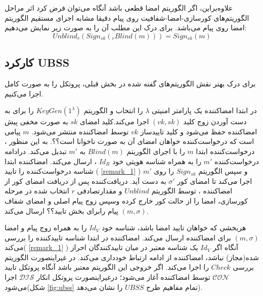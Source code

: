 \documentclass[12pt,a4paper]{article}
\theoremstyle{plain}
\theoremstyle{definition}
\theoremstyle{remark}
\begin{document}
علاوه‌براین، اگر الگوریتم امضا قطعی باشد آنگاه می‌توان فرض کرد اثر مراحل الگوریتم‌های کورسازی-امضا-شفافیت روی پیام دقیقا مشابه اجرای مستقیم الگوریتم امضا روی پیام می‌باشد. برای درک این مطلب آن را به صورت زیر نمایش می‌دهیم:
$$ Unblind_r(Sign_{sk}(_{r}Blind(m))) = Sign_{sk}(m) $$

\newpage
\subsection{کارکرد UBSS}\label{working_ubss}

برای درک بهتر نقش الگوریتم‌های گفته شده در بخش قبلی، پروتکل را به صورت کامل اجرا می‌کنیم.

در ابتدا امضاکننده یک پارامتر امنیتی 
$\lambda$
را انتخاب و الگوریتم 
$KeyGen(1^\lambda)$
را برای به دست آوردن زوج کلید
$(vk,sk)$
اجرا می‌کند.کلید امضای
$sk$
به صورت مخفی پیش امضاکننده حفظ می‌شود و کلید تاییدساز
$vk$
توسط امضاکننده منتشر می‌شود.
$m$
پیامی است که درخواست‌کننده خواهان امضای آن به صورت ناخوانا است؟؟. به این منظور ، درخواست‌کننده ابتدا 
$m$
 را با اجرای الگوریتم 
$Blind(m)$
به 
$m'$
تبدیل می‌کند.
درادامه درخواست‌کننده 
$m'$
را به همراه شناسه هویتی خود
$Id_R$
، ارسال می‌کند. امضاکننده ابتدا شناسه درخواست‌کننده را تایید (
\ref{remark_1}
) و سپس الگوریتم 
$Sign_{sk}$
را روی
$m'$
اجرا می‌کند تا امضای کور
$\sigma'$
به دست آید. دریافت‌کننده پس از دریافت امضای کور از امضاکننده ، توسط الگوریتم
$Unblind$
 و مقدارتصادفی 
$r$
انتخاب شده در مرحله کورسازی، امضا را از حالت کور خارج کرده وسپس زوج پیام اصلی و امضای شفاف
$(m,\sigma)$
پیام رابرای بخش تایید؟؟ ارسال می‌کند.

هربخشی که خواهان تایید امضا باشد، شناسه خود
$Id_V$
را به همراه زوج پیام و امضا 
$(m,\sigma)$
برای امضاکننده ارسال می‌کند. امضاکننده در ابتدا شناسه تاییدکننده را بررسی می‌کند(
\ref{remark_1}
) آنگاه اگر
$Id_V$
یک شناسه معتبر در میان تاییدکنندگان احراز شده(مجاز) نباشد، امضاکننده از ادامه ارتباط خودداری می‌کند. در غیراینصورت الگوریتم بررسی 
$Check$
را اجرا می‌کند. اگر خروجی این الگوریتم معتبر باشد آنگاه پروتکل تایید
$\mathcal{CON}$
توسط امضاکننده آغاز می‌شود؛ درغیراینصورت پروتکل انکار
$\mathcal{DIS}$
اجرا می‌شود(شکل 
\ref{fig:ubss}
 تمام مفاهیم طرح 
$UBSS$
را نشان می‌دهد).
\end{document}
